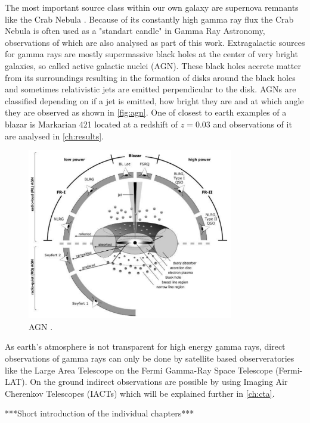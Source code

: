 The most important source class within our own galaxy are supernova remnants like the Crab Nebula \cite{nuimeprn12618}. 
Because of its constantly high gamma ray flux the Crab Nebula is often used as a "standart candle" in Gamma Ray Astronomy, observations of which are also 
analysed as part of this work.
Extragalactic sources for gamma rays are mostly supermassive black holes at the center of very bright galaxies, so called active galactic nuclei (AGN).
These black holes accrete matter from its surroundings resulting in the formation of disks around the black holes and sometimes relativistic jets are emitted 
perpendicular to the disk.
AGNs are classified depending on if a jet is emitted, how bright they are and at which angle they are observed as shown in \autoref{fig:agn}.
One of closest to earth examples of a blazar is Markarian 421 located at a redshift of $z = \num{0.03}$ \cite{Albert_2007} and observations of it are analysed in 
\autoref{ch:results}.
\begin{figure}
    \centering
    \includegraphics[width=0.8\textwidth]{logos/agn.png}
    \caption{AGN \cite{doi:10.1002/9783527666829.ch4}.}
    \label{fig:agn}
\end{figure}


As earth's atmosphere is not transparent for high energy gamma rays, direct observations of gamma rays can only be done by satellite based observeratories 
like the Large Area Telescope on the Fermi Gamma-Ray Space Telescope (Fermi-LAT).
On the ground indirect observations are possible by using Imaging Air Cherenkov Telescopes (IACTs) which will be explained further in \autoref{ch:cta}.


***Short introduction of the individual chapters***
